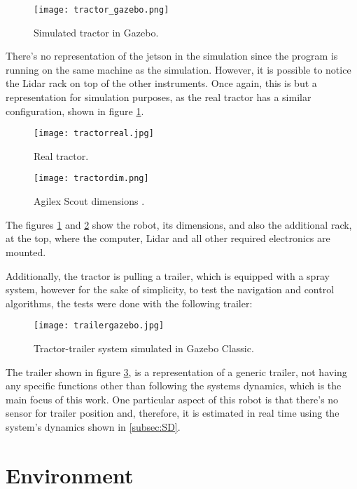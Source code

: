 \begin{figure}[h]
    \centering
    \texttt{[image: tractor\_gazebo.png]}
    \caption{Simulated tractor in Gazebo.}
\end{figure}

There's no representation of the jetson in the simulation since the program is running on 
the same machine as the simulation. However, it is possible to 
notice the Lidar rack on top of the other instruments. Once again, this is 
but a representation for simulation purposes, as the real tractor has a similar 
configuration, shown in figure \ref{fig:tractor}.
\begin{figure}[h]
    \centering
    \texttt{[image: tractorreal.jpg]}
    \caption{Real tractor.}
    \label{fig:tractor}
\end{figure}

 
\begin{figure}[h]
    \centering
    \texttt{[image: tractordim.png]}
    \caption{Agilex Scout dimensions \cite{scoutdim}.}
    \label{fig:tractordim}
\end{figure}

The figures \ref{fig:tractor} and \ref{fig:tractordim} show the robot, its dimensions, and also 
the additional rack, at the top, where the computer, Lidar and all other required electronics 
are mounted.

Additionally, the tractor is pulling a trailer, which is equipped with 
a spray system, however for the sake of simplicity, to test the navigation 
and control algorithms, the tests were done with the following trailer:
\clearpage
\begin{figure}[h]
    \centering
    \texttt{[image: trailergazebo.jpg]}
    \caption{Tractor-trailer system simulated in Gazebo Classic.}
    \label{fig:trailergazebo}
\end{figure}

The trailer shown in figure \ref{fig:trailergazebo}, is a representation of a generic trailer, not having any specific 
functions other than following the systems dynamics, which is the main focus of this work. 
One particular aspect of this robot is that there's no sensor for 
trailer position and, therefore, it is estimated in real time using the 
system's dynamics shown in \ref{subsec:SD}.



\section{Environment}
\label{subsec:environment}
